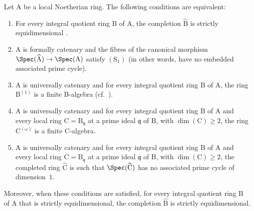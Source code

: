 \begin{theorem}[7.2.5]
\label{IV.7.2.5}
Let $\mathrm{A}$ be a local Noetherian ring.
The following conditions are equivalent:
\begin{enumerate}[label=\emph{\alph*)}]
  \item For every integral quotient ring $\mathrm{B}$ of $\mathrm{A}$, the completion $\widehat{\mathrm{B}}$ is strictly equidimensional .
  \item $\mathrm{A}$ is formally catenary  and the fibres of the canonical morphism $\Spec(\widehat{\mathrm{A}})\to\Spec(\mathrm{A})$ satisfy $(\mathrm{S}_1)$ (in other words, have no embedded associated prime cycle).
  \item $\mathrm{A}$ is universally catenary  and for every integral quotient ring $\mathrm{B}$ of $\mathrm{A}$, the ring $\mathrm{B}^{(1)}$ is a finite B-algebra (cf.\ ).
  \item $\mathrm{A}$ is universally catenary and for every integral quotient ring $\mathrm{B}$ of $\mathrm{A}$ and every local ring $\mathrm{C}=\mathrm{B}_\mathfrak{q}$ at a prime ideal $\mathfrak{q}$ of $\mathrm{B}$, with $\dim(\mathrm{C})\geqslant 2$, the ring $\mathrm{C}^{(\omega)}$ is a finite C-algebra.
  \item $\mathrm{A}$ is universally catenary and for every integral quotient ring $\mathrm{B}$ of $\mathrm{A}$ and every local ring $\mathrm{C}=\mathrm{B}_\mathfrak{q}$ at a prime ideal $\mathfrak{q}$ of $\mathrm{B}$, with $\dim(\mathrm{C})\geqslant 2$, the completed ring $\widehat{\mathrm{C}}$ is such that $\Spec(\widehat{\mathrm{C}})$ has no associated prime cycle of dimension~$1$.
\end{enumerate}
Moreover, when these conditions are satisfied, for every integral quotient ring $\mathrm{B}$ of $\mathrm{A}$ that is strictly equidimensional, the completion $\widehat{\mathrm{B}}$ is strictly equidimensional.
\end{theorem}

